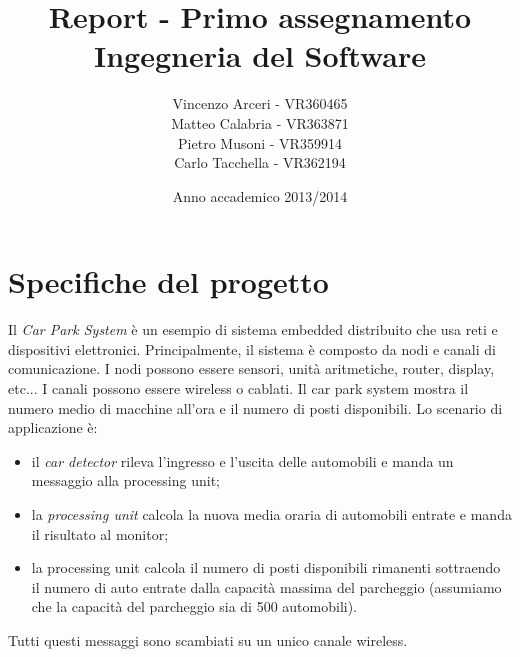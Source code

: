 \documentclass[a4paper,10pt]{article}
\begin{document}
\title{Report - Primo assegnamento Ingegneria del Software}
\author{Vincenzo Arceri - VR360465\\
 Matteo Calabria - VR363871\\
 Pietro Musoni - VR359914\\ 
Carlo Tacchella - VR362194\\}
\date{Anno accademico 2013/2014}
\maketitle

\section{Specifiche del progetto}

Il \textit{Car Park System} è un esempio di sistema embedded distribuito che usa reti e dispositivi elettronici.
Principalmente, il sistema è composto da nodi e canali di comunicazione. I nodi possono essere sensori, unità aritmetiche,
router, display, etc...  I canali possono essere wireless o cablati.
Il car park system mostra il numero medio di macchine all'ora e il numero di posti disponibili. 
Lo scenario di applicazione è:
\begin{itemize}
\item il \textit{car detector} rileva l'ingresso e l'uscita delle automobili e manda un messaggio alla processing unit;
\item la \textit{processing unit} calcola la nuova media oraria di automobili entrate e manda il risultato al monitor;
\item la processing unit calcola il numero di posti disponibili rimanenti sottraendo il numero di auto entrate dalla capacità massima del parcheggio (assumiamo che la capacità del parcheggio sia di 500 automobili).
\end{itemize}
Tutti questi messaggi sono scambiati su un unico canale wireless.
\end{document}
